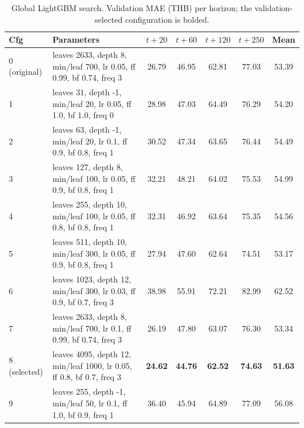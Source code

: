 \documentclass[11pt]{article}
\begin{document}
\begin{table}[htbp]\centering
\caption{Global LightGBM search. Validation MAE (THB) per horizon; the validation-selected configuration is bolded.}
\label{tab:lgb}
\scriptsize
\setlength{\tabcolsep}{3.5pt}
\begin{tabular}{llccccc}
\toprule
Cfg & Parameters & $t{+}20$ & $t{+}60$ & $t{+}120$ & $t{+}250$ & Mean \\
\midrule
0 (original) & leaves 2633, depth 8, min/leaf 700, lr 0.05, ff 0.99, bf 0.74, freq 3 & 26.79 & 46.95 & 62.81 & 77.03 & 53.39 \\
1 & leaves 31, depth -1, min/leaf 20, lr 0.05, ff 1.0, bf 1.0, freq 0 & 28.98 & 47.03 & 64.49 & 76.29 & 54.20 \\
2 & leaves 63, depth -1, min/leaf 20, lr 0.1, ff 0.9, bf 0.8, freq 1 & 30.52 & 47.34 & 63.65 & 76.44 & 54.49 \\
3 & leaves 127, depth 8, min/leaf 100, lr 0.05, ff 0.9, bf 0.8, freq 1 & 32.21 & 48.21 & 64.02 & 75.53 & 54.99 \\
4 & leaves 255, depth 10, min/leaf 100, lr 0.05, ff 0.8, bf 0.8, freq 1 & 32.31 & 46.92 & 63.64 & 75.35 & 54.56 \\
5 & leaves 511, depth 10, min/leaf 300, lr 0.05, ff 0.9, bf 0.8, freq 1 & 27.94 & 47.60 & 62.64 & 74.51 & 53.17 \\
6 & leaves 1023, depth 12, min/leaf 300, lr 0.03, ff 0.9, bf 0.7, freq 3 & 38.98 & 55.91 & 72.21 & 82.99 & 62.52 \\
7 & leaves 2633, depth 8, min/leaf 700, lr 0.1, ff 0.99, bf 0.74, freq 3 & 26.19 & 47.80 & 63.07 & 76.30 & 53.34 \\
8 (selected) & leaves 4095, depth 12, min/leaf 1000, lr 0.05, ff 0.8, bf 0.7, freq 3 & \textbf{24.62} & \textbf{44.76} & \textbf{62.52} & \textbf{74.63} & \textbf{51.63} \\
9 & leaves 255, depth -1, min/leaf 50, lr 0.1, ff 1.0, bf 0.9, freq 1 & 36.40 & 45.94 & 64.89 & 77.09 & 56.08 \\
\bottomrule
\end{tabular}
\end{table}
\end{document}
